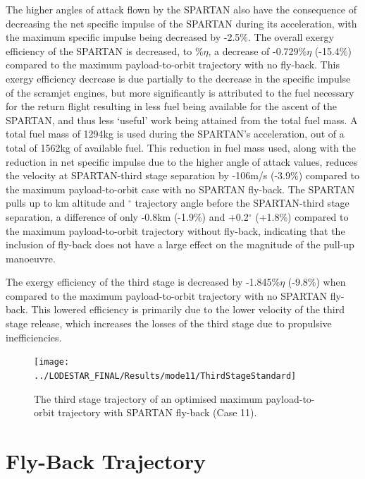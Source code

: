 The higher angles of attack flown by the SPARTAN also have the consequence of decreasing the net specific impulse of the SPARTAN during its acceleration, with the maximum specific impulse being decreased by -2.5\%.
The overall exergy efficiency of the SPARTAN is decreased, to \secondExergyEffStandard\%$\eta$, a decrease of -0.729\%$\eta$ (-15.4\%) compared to the maximum payload-to-orbit trajectory with no fly-back. This exergy efficiency decrease is due partially to the decrease in the specific impulse of the scramjet engines, but more significantly is attributed to the fuel necessary for the return flight resulting in less fuel being available for the ascent of the SPARTAN, and thus less `useful' work being attained from the total fuel mass.
A total fuel mass of 1294kg is used during the SPARTAN's acceleration, out of a total of 1562kg of available fuel. This reduction in fuel mass used, along with the reduction in net specific impulse due to the higher angle of attack values, reduces the velocity at SPARTAN-third stage separation by -106m/s (-3.9\%) compared to the maximum payload-to-orbit case with no SPARTAN fly-back. The SPARTAN pulls up to \secondthirdSeparationAltStandard km altitude and \secondthirdSeparationgammaStandard $^\circ$ trajectory angle before the SPARTAN-third stage separation, a difference of only -0.8km (-1.9\%) and +0.2$^\circ$ (+1.8\%) compared to the maximum payload-to-orbit trajectory without fly-back, indicating that the inclusion of fly-back does not have a large effect on the magnitude of the pull-up manoeuvre. 

The exergy efficiency of the third stage is decreased by -1.845\%$\eta$ (-9.8\%) when compared to the maximum payload-to-orbit trajectory with no SPARTAN fly-back. This lowered efficiency is primarily due to the lower velocity of the third stage release, which increases the losses of the third stage due to propulsive inefficiencies. 


\begin{figure}[ht!]
\centering
\texttt{[image: ../LODESTAR\_FINAL/Results/mode11/ThirdStageStandard]}
\caption{The third stage trajectory of an optimised maximum payload-to-orbit trajectory with SPARTAN fly-back (Case 11). }
\label{fig:ThirdStageStandard}
\end{figure}


\section{Fly-Back Trajectory}

